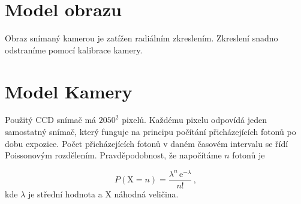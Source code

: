  

\section{Model obrazu}

Obraz snímaný kamerou je zatížen radiálním zkreslením. Zkreslení snadno odstraníme pomocí kalibrace kamery\cite{Drapela}. 


\section{Model Kamery}
\label{sec:poisson}
 Použitý CCD snímač má $2050^2$ pixelů. Každému pixelu odpovídá jeden samostatný snímač, který funguje na principu počítání přicházejících fotonů po dobu expozice. Počet přicházejících fotonů v daném časovém intervalu se řídí Poissonovým rozdělením. Pravděpodobnost, že napočítáme $n$ fotonů je 
 
 \begin{equation}
    P(\mathrm{X} = n)=\frac{\lambda ^{n}\,\mathrm{e}^{-\lambda}}{n!}\,,
 \end{equation}
 kde $\lambda$ je střední hodnota a $\mathrm{X}$ náhodná veličina.













